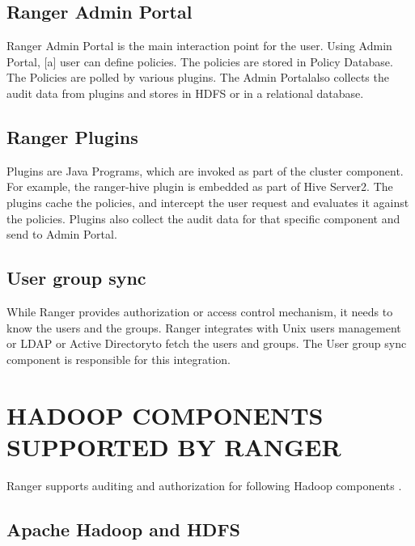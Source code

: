 \documentclass[9pt,twocolumn,twoside]{../../styles/osajnl}
\begin{document}
\subsection{Ranger Admin Portal}

Ranger Admin Portal is the main interaction point for the user. Using Admin
Portal, [a] \GE user can define policies. The policies are stored in Policy Database\GE.
 The Policies are polled by various plugins. The Admin Portal\GE also collects
 the audit data from plugins and stores in HDFS or in a relational database.


\subsection{Ranger Plugins}

Plugins are Java Programs, which are invoked as part of the cluster component.
 For example, the ranger-hive plugin is embedded as part of Hive Server2. The
  plugins cache the policies, and intercept the user request and evaluates it
   against the policies. Plugins also collect the audit data for that
   specific component and send to Admin Portal\SE.


\subsection{User group sync}

While Ranger provides authorization or access control mechanism, it needs to
know the users and the groups. Ranger integrates with Unix users management or
LDAP or Active Directory\SE to fetch the users and groups. The User group sync
component is responsible for this integration.



\section{HADOOP COMPONENTS SUPPORTED BY RANGER}

Ranger supports auditing and authorization for following Hadoop components
\cite{www-ranger-faq}.

\subsection{Apache Hadoop and HDFS}
\end{document}
